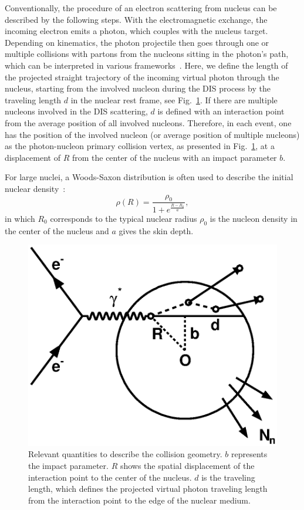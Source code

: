 Conventionally, the procedure of an electron scattering from nucleus can be
described by the following steps. With the electromagnetic exchange, the
incoming electron emits a photon, which couples with the nucleus target.
Depending on kinematics, the photon projectile then goes through one or multiple
collisions with partons from the nucleons sitting in the photon's path, which
can be interpreted in various frameworks~\cite{Piller:1995kh}. Here, we define
the length of the projected straight trajectory of the incoming virtual photon
through the nucleus, starting from the involved nucleon during the DIS process
by the traveling length $d$ in the nuclear rest frame, see
Fig.~\ref{fig:geometry}. If there are multiple nucleons involved in the DIS
scattering, $d$ is defined with an interaction point from the average position
of all involved nucleons. Therefore, in each event, one has the position of the
involved nucleon (or average position of multiple nucleons) as the
photon-nucleon primary collision vertex, as presented in
Fig.~\ref{fig:geometry}, at a displacement of $R$ from the center of the nucleus
with an impact parameter $b$.

For large nuclei, a Woods-Saxon distribution is often used to describe the 
initial nuclear density~\cite{Miller:2007ri}:
\begin{equation}
\rho(R)=\frac{\rho_{0}}{1+e^{\frac{R-R_{0}}{a}}},
\label{eqn:woodsaxon}
\end{equation}
in which $R_{0}$ corresponds to the typical nuclear radius $\rho_{0}$ is the nucleon density in the center of the nucleus and $a$ gives the skin depth.

\begin{figure}
\begin{center}
\includegraphics[width=0.5\columnwidth]{plots/chpt7/geometry_definition.eps}
\caption[Geometry quantity definition] {Relevant quantities to describe the collision geometry. $b$ represents the impact parameter. $R$ shows the spatial displacement of the interaction point to the center of the nucleus. $d$ is the traveling length, which defines the projected virtual photon traveling length from the interaction point to the edge of the nuclear medium.}
\label{fig:geometry}
\end{center}
\end{figure}

